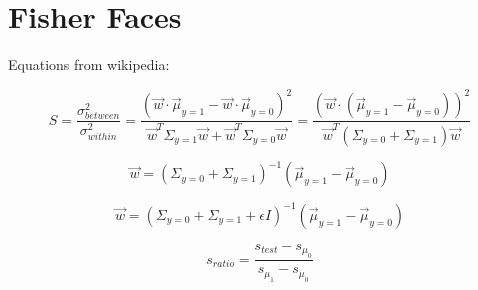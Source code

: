 



\section{Fisher Faces}

Equations from wikipedia:

\begin{equation}
S=\frac{\sigma_{between}^2}{\sigma_{within}^2}= \frac{(\vec w \cdot \vec \mu_{y=1} - \vec w \cdot \vec \mu_{y=0})^2}{\vec w^T \Sigma_{y=1} \vec w + \vec w^T \Sigma_{y=0} \vec w} = \frac{(\vec w \cdot (\vec \mu_{y=1} - \vec \mu_{y=0}))^2}{\vec w^T (\Sigma_{y=0}+\Sigma_{y=1}) \vec w}
\end{equation}

\begin{equation}
\vec w = (\Sigma_{y=0}+\Sigma_{y=1})^{-1}(\vec \mu_{y=1} - \vec \mu_{y=0})
\end{equation}

\begin{equation}
\vec w = (\Sigma_{y=0} + \Sigma_{y=1} + \epsilon I)^{-1}(\vec \mu_{y=1} - \vec \mu_{y=0})
\end{equation}


\begin{equation}
s_{ratio} = \frac{s_{test} - s_{\mu_0}}{s_{\mu_1} - s_{\mu_0}}
\end{equation}



% 
% 
  
